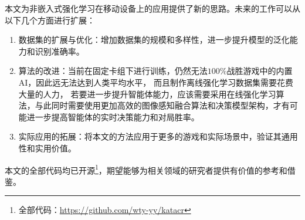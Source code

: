 本文为非嵌入式强化学习在移动设备上的应用提供了新的思路。未来的工作可以从以下几个方面进行扩展：
\begin{enumerate}
  \item 数据集的扩展与优化：增加数据集的规模和多样性，进一步提升模型的泛化能力和识别准确率。
  \item 算法的改进：当前在固定卡组下进行训练，仍然无法$100\%$战胜游戏中的内置AI，因此远无法达到人类平均水平，
  而且制作离线强化学习数据集需要花费大量的人力，
  若要进一步提升智能体能力，应该需要采用在线强化学习算法，与此同时需要使用更加高效的图像感知融合算法和决策模型架构，才有可能进一步提高智能体的实时决策能力和对局胜率。
  \item 实际应用的拓展：将本文的方法应用于更多的游戏和实际场景中，验证其通用性和实用价值。
\end{enumerate}

本文的全部代码均已开源\footnote{全部代码：\url{https://github.com/wty-yy/katacr}}，期望能够为相关领域的研究者提供有价值的参考和借鉴。